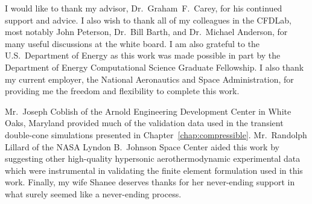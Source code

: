 
I would like to thank my advisor, \mbox{Dr.\ Graham F.\ Carey}, for his continued support and advice.  I also wish to thank all of my colleagues in the CFDLab, most notably John Peterson, Dr.\ Bill Barth, and Dr.\ Michael Anderson, for many useful discussions at the white board.  I am also grateful to the U.S.\ Department of Energy as this work was made possible in part by the Department of Energy Computational Science Graduate Fellowship.  I also thank my current employer, the National Aeronautics and Space Administration, for providing me the freedom and flexibility to complete this work.

Mr.\ Joseph Coblish of the Arnold Engineering Development Center in White Oaks, Maryland provided much of the validation data used in the transient double-cone simulations presented in Chapter~\ref{chap:compressible}. Mr.\ Randolph Lillard of the NASA Lyndon B.\ Johnson Space Center aided this work by suggesting other high-quality hypersonic aero\-thermodynamic experimental data which were instrumental in validating the finite element formulation used in this work.  Finally, my wife Shanee deserves thanks for her never-ending support in what surely seemed like a never-ending process.


